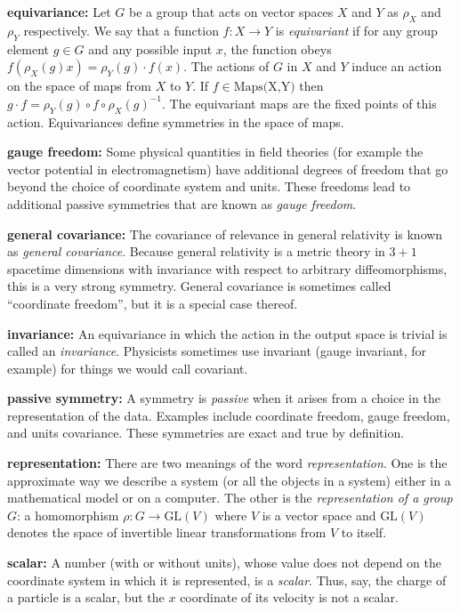 \documentclass{article}
\theoremstyle{plain}
\theoremstyle{definition}
\theoremstyle{remark}
\begin{document}
\textbf{equivariance:}
Let $G$ be a group that acts on vector spaces $X$ and $Y$ as $\rho_X$ and $\rho_Y$ respectively. We say that a function $f:X\to Y$ is \emph{equivariant} if for any group element $g\in G$ and any possible input $x$, the function obeys $f( \rho_X(g) x) = \rho_Y(g)\cdot f(x)$.
The actions of $G$ in $X$ and $Y$ induce an action on the space of maps from $X$ to $Y$. If $f\in \text{Maps(X,Y)}$ then $g\cdot f = \rho_Y(g)\circ f \circ \rho_X(g)^{-1}$.
The equivariant maps are the fixed points of this action.
Equivariances define symmetries in the space of maps. 

\textbf{gauge freedom:}
Some physical quantities in field theories (for example the vector potential in electromagnetism) have additional degrees of freedom that go beyond the choice of coordinate system and units.
These freedoms lead to additional passive symmetries that are known as \emph{gauge freedom}.

\textbf{general covariance:}
The covariance of relevance in general relativity \cite{einstein} is known as \emph{general covariance}.
Because general relativity is a metric theory in $3+1$ spacetime dimensions with invariance with respect to arbitrary diffeomorphisms, this is a very strong symmetry.
General covariance is sometimes called ``coordinate freedom'', but it is a special case thereof.

\textbf{invariance:}
An equivariance in which the action in the output space is trivial is called an \emph{invariance}. Physicists sometimes use invariant (gauge invariant, for example) for things we would call covariant.

\textbf{passive symmetry:}
A symmetry is \emph{passive} when it arises from a choice in the representation of the data. 
Examples include coordinate freedom, gauge freedom, and units covariance.
These symmetries are exact and true by definition.

\textbf{representation:}
There are two meanings of the word \emph{representation}. One is the approximate way we describe a system (or all the objects in a system) either in a mathematical model or on a computer.
The other is the \emph{representation of a group} $G$: a homomorphism $\rho: G\to \text{GL}(V)$ where $V$ is a vector space and $\text{GL}(V)$ denotes the space of invertible linear transformations from $V$ to itself.

\textbf{scalar:}
A number (with or without units), whose value does not depend on the coordinate system in which it is represented, is a \emph{scalar}.
Thus, say, the charge of a particle is a scalar, but the $x$ coordinate of its velocity is not a scalar.
\end{document}
